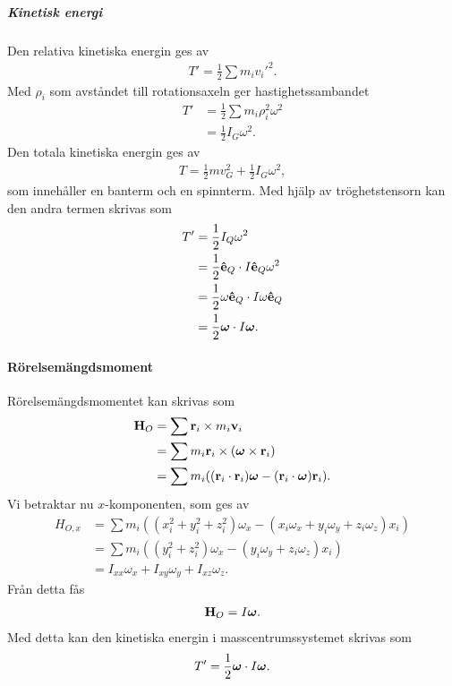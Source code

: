 \subparagraph{Kinetisk energi}
Den relativa kinetiska energin ges av
\begin{align*}
	T' = \frac{1}{2}\sum m_{i}v_{i}'^{2}.
\end{align*}
Med $\rho_{i}$ som avståndet till rotationsaxeln ger hastighetssambandet
\begin{align*}
	T' &= \frac{1}{2}\sum m_{i}\rho_{i}^{2}\omega^{2} \\
	   &= \frac{1}{2}I_{G}\omega^{2}.
\end{align*}
Den totala kinetiska energin ges av
\begin{align*}
	T = \frac{1}{2}mv_{G}^{2} + \frac{1}{2}I_{G}\omega^{2},
\end{align*}
som innehåller en banterm och en spinnterm. Med hjälp av tröghetstensorn kan den andra termen skrivas som
\begin{align*}
	T' &= \frac{1}{2}I_{Q}\omega^2 \\
	   &= \frac{1}{2}\vu{e}_{Q}\cdot I\vu{e}_{Q}\omega^2 \\
	   &= \frac{1}{2}\omega\vu{e}_{Q}\cdot I\omega\vu{e}_{Q} \\
	   &= \frac{1}{2}\vb*{\omega}\cdot I\vb*{\omega}.
\end{align*}

\paragraph{Rörelsemängdsmoment}
Rörelsemängdsmomentet kan skrivas som
\begin{align*}
	\vb{H}_{O} &= \sum \vb{r}_{i}\times m_{i}\vb{v}_{i} \\
	           &= \sum m_{i}\vb{r}_{i}\times(\vb*{\omega}\times\vb{r}_{i}) \\
	           &= \sum m_{i}((\vb{r}_{i}\cdot\vb{r}_{i})\vb*{\omega} - (\vb{r}_{i}\cdot\vb*{\omega})\vb{r}_{i}).
\end{align*}
Vi betraktar nu $x$-komponenten, som ges av
\begin{align*}
	H_{O, x} &= \sum m_{i}((x_{i}^2 + y_{i}^2 + z_{i}^2)\omega_{x} - (x_{i}\omega_{x} + y_{i}\omega_{y} + z_{i}\omega_{z})x_{i}) \\
	         &= \sum m_{i}((y_{i}^2 + z_{i}^2)\omega_{x} - (y_{i}\omega_{y} + z_{i}\omega_{z})x_{i}) \\
	         &= I_{xx}\omega_{x} + I_{xy}\omega_{y} + I_{xz}\omega_{z}.
\end{align*}
Från detta fås
\begin{align*}
	\vb{H}_{O} = I\vb*{\omega}.
\end{align*}
Med detta kan den kinetiska energin i masscentrumssystemet skrivas som
\begin{align*}
	T' = \frac{1}{2}\vb*{\omega}\cdot I\vb*{\omega}.
\end{align*}


